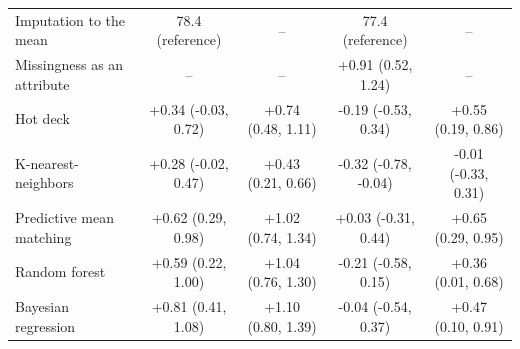 \documentclass{article}
\begin{document}
\begin{table}
\begin{tabular}{lcccc}
\midrule
Imputation to the mean & 78.4 (reference) & -- & 77.4 (reference) & -- \\ 
Missingness as an attribute & -- & -- & +0.91 (0.52, 1.24) & -- \\ 
Hot deck & +0.34 (-0.03, 0.72) & +0.74 (0.48, 1.11) & -0.19 (-0.53, 0.34) & +0.55 (0.19, 0.86) \\ 
K-nearest-neighbors & +0.28 (-0.02, 0.47) & +0.43 (0.21, 0.66) & -0.32 (-0.78, -0.04) & -0.01 (-0.33, 0.31) \\ 
Predictive mean matching & +0.62 (0.29, 0.98) & +1.02 (0.74, 1.34) & +0.03 (-0.31, 0.44) & +0.65 (0.29, 0.95) \\ 
Random forest & +0.59 (0.22, 1.00) & +1.04 (0.76, 1.30) & -0.21 (-0.58, 0.15) & +0.36 (0.01, 0.68) \\ 
Bayesian regression & +0.81 (0.41, 1.08) & +1.10 (0.80, 1.39) & -0.04 (-0.54, 0.37) & +0.47 (0.10, 0.91) \\ 
\bottomrule
\end{tabular} 
 \end{table}

\clearpage
\end{document}
